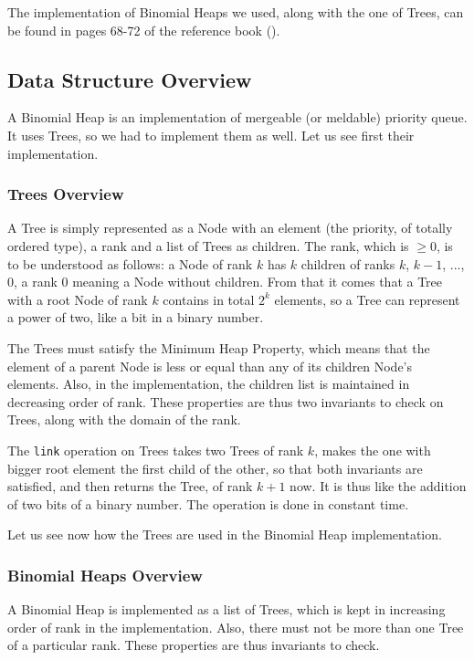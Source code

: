 The implementation of Binomial Heaps we used, 
along with the one of Trees, 
can be found in pages 68-72 of the reference book (\cite{Okasaki}).

\subsection{Data Structure Overview}
A Binomial Heap is an implementation of mergeable (or meldable) priority queue.
It uses Trees, so we had to implement them as well.
Let us see first their implementation.

\subsubsection{Trees Overview}
A Tree is simply represented as a Node with an element 
(the priority, of totally ordered type), a rank and a list of Trees as children.
The rank, which is $\geq 0$, is to be understood as follows:
a Node of rank $k$ has $k$ children of ranks $k$, $k-1$, ..., $0$,
a rank $0$ meaning a Node without children.
From that it comes that a Tree with a root Node of rank $k$ 
contains in total $2^k$ elements,
so a Tree can represent a power of two, 
like a bit in a binary number.

The Trees must satisfy the Minimum Heap Property, 
which means that the element of a parent Node 
is less or equal than any of its children Node's elements.
Also, in the implementation, the children list is maintained in decreasing order of rank.
These properties are thus two invariants to check on Trees,
along with the domain of the rank.

The \verb|link| operation on Trees takes two Trees of rank $k$, 
makes the one with bigger root element the first child of the other,
so that both invariants are satisfied,
and then returns the Tree, of rank $k+1$ now.
It is thus like the addition of two bits of a binary number.
The operation is done in constant time.

Let us see now how the Trees are used in the Binomial Heap implementation.

\subsubsection{Binomial Heaps Overview}
A Binomial Heap is implemented as a list of Trees, 
which is kept in increasing order of rank in the implementation.
Also, there must not be more than one Tree of a particular rank.
These properties are thus invariants to check.
 
